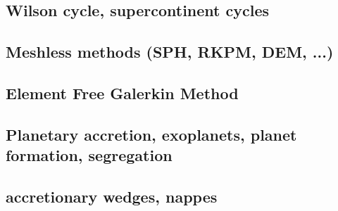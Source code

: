 \subsection*{Wilson cycle, supercontinent cycles}

\noindent
\cite{trry95}
\cite{zhzl07}
\cite{zhzm09}
\cite{begb19}

\subsection*{Meshless methods (SPH, RKPM, DEM, ...)}

\noindent
\cite{lucy77}
\cite{beko96}
\cite{mofz97}
\cite{febh05}
\cite{dacl10}
\cite{prcl11}\cite{kukg11}
\cite{koau13}
\cite{nifs15}
\cite{krrk18}

\subsection*{Element Free Galerkin Method}
 

\noindent
\cite{belg95a}
\cite{belg95b}
\cite{bekf96}
\cite{bekk97}
\cite{pobe98}

\subsection*{Planetary accretion, exoplanets, planet formation, segregation}
 

\noindent
\cite{lejm08}
\cite{ligt09}\cite{gogk09}
\cite{ligt11}
\cite{gobg14}\cite{yadl14}
\cite{neum19}

\subsection*{accretionary wedges, nappes} 

